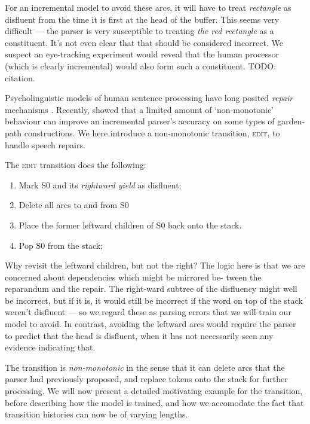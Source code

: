 \documentclass[11pt,letterpaper]{article}
\newcommand{\szero}{S0\xspace}
\begin{document}
For an incremental model to avoid these arcs, it will have to treat \emph{rectangle}
as disfluent from the time it is first at the head of the buffer.  This seems
very difficult --- the parser is very susceptible to
treating \emph{the red rectangle} as a constituent.  It's not even clear that
that should be considered incorrect.  We suspect an eye-tracking experiment would
reveal that the human processor (which is clearly incremental) would also form
such a constituent.  TODO: citation.

Psycholinguistic models of human sentence processing have long posited
\emph{repair} mechanisms \citep{FrazierRayner1982}.  Recently, \citet{honnibal:13}
showed that a limited amount of `non-monotonic' behaviour can 
improve an incremental parser's accuracy on some types of garden-path constructions.
We here introduce a non-monotonic transition, \textsc{edit}, to handle speech
repairs. 

The \textsc{edit} transition does the following:

\begin{enumerate}
    \item Mark \szero and its \emph{rightward yield} as disfluent;
    \item Delete all arcs to and from \szero
    \item Place the former leftward children of \szero back onto the stack.
    \item Pop \szero from the stack;
\end{enumerate}

Why revisit the leftward children, but not the right? The logic here is that we
are concerned about dependencies which might be mirrored be- tween the reparandum
and the repair. The right-ward subtree of the disfluency might well be incorrect,
but if it is, it would still be incorrect if the word on top of the stack weren't
disfluent --– so we regard these as parsing errors that we will train our model
to avoid. In contrast, avoiding the leftward arcs would require the parser to
predict that the head is disfluent, when it has not necessarily seen any evidence
indicating that.

The transition is \emph{non-monotonic} in the sense that it can delete arcs
that the parser had previously proposed, and replace tokens onto the stack for
further processing.  We will now present a detailed motivating example for the
transition, before describing how the model is trained, and how we accomodate
the fact that transition histories can now be of varying lengths.
\end{document}
